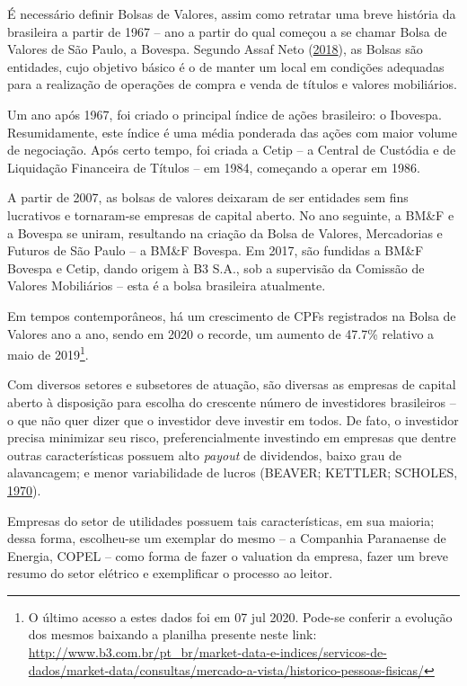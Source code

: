 \documentclass[grad,numbers]{coppe}
\begin{document}
  É necessário definir Bolsas de Valores, assim como retratar uma breve história da brasileira a partir de 1967 -- ano a partir do qual começou a se chamar Bolsa de Valores de São Paulo, a Bovespa. Segundo Assaf Neto (\protect\hyperlink{ref-assafneto2018}{2018}), as Bolsas são entidades, cujo objetivo básico é o de manter um local em condições adequadas para a realização de operações de compra e venda de títulos e valores mobiliários.
  
  Um ano após 1967, foi criado o principal índice de ações brasileiro: o Ibovespa. Resumidamente, este índice é uma média ponderada das ações com maior volume de negociação. Após certo tempo, foi criada a Cetip -- a Central de Custódia e de Liquidação Financeira de Títulos -- em 1984, começando a operar em 1986.
  
  A partir de 2007, as bolsas de valores deixaram de ser entidades sem fins lucrativos e tornaram-se empresas de capital aberto. No ano seguinte, a BM\&F e a Bovespa se uniram, resultando na criação da Bolsa de Valores, Mercadorias e Futuros de São Paulo -- a BM\&F Bovespa. Em 2017, são fundidas a BM\&F Bovespa e Cetip, dando origem à B3 S.A., sob a supervisão da Comissão de Valores Mobiliários -- esta é a bolsa brasileira atualmente.
  
  Em tempos contemporâneos, há um crescimento de CPFs registrados na Bolsa de Valores ano a ano, sendo em 2020 o recorde, um aumento de 47.7\% relativo a maio de 2019\footnote{O último acesso a estes dados foi em 07 jul 2020. Pode-se conferir a evolução dos mesmos baixando a planilha presente neste link: \url{http://www.b3.com.br/pt_br/market-data-e-indices/servicos-de-dados/market-data/consultas/mercado-a-vista/historico-pessoas-fisicas/}}.
  
  Com diversos setores e subsetores de atuação, são diversas as empresas de capital aberto à disposição para escolha do crescente número de investidores brasileiros -- o que não quer dizer que o investidor deve investir em todos. De fato, o investidor precisa minimizar seu risco, preferencialmente investindo em empresas que dentre outras características possuem alto \emph{payout} de dividendos, baixo grau de alavancagem; e menor variabilidade de lucros (BEAVER; KETTLER; SCHOLES, \protect\hyperlink{ref-beaver1970}{1970}).
  
  Empresas do setor de utilidades possuem tais características, em sua maioria; dessa forma, escolheu-se um exemplar do mesmo -- a Companhia Paranaense de Energia, COPEL -- como forma de fazer o valuation da empresa, fazer um breve resumo do setor elétrico e exemplificar o processo ao leitor.
  
\end{document}
